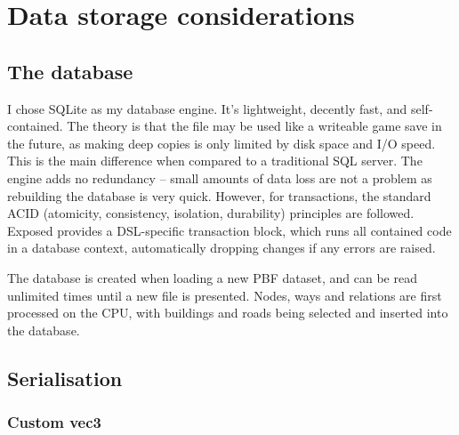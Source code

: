 \chapter{Data storage considerations}
\section{The database}

I chose SQLite as my database engine. It's lightweight, decently fast, and self-contained. The theory is that the file may be used like a writeable game save in the future, as making deep copies is only limited by disk space and I/O speed. This is the main difference when compared to a traditional SQL server. The engine adds no redundancy -- small amounts of data loss are not a problem as rebuilding the database is very quick. However, for transactions, the standard ACID (atomicity, consistency, isolation, durability) principles are followed. Exposed provides a DSL-specific transaction block, which runs all contained code in a database context, automatically dropping changes if any errors are raised.

The database is created when loading a new PBF dataset, and can be read unlimited times until a new file is presented. Nodes, ways and relations are first processed on the CPU, with buildings and roads being selected and inserted into the database. 

\label{serialise}
\section{Serialisation}

\subsection{Custom vec3}